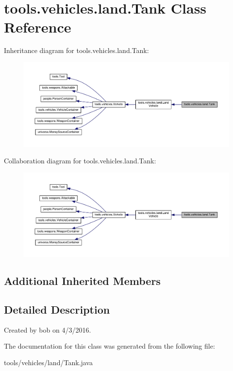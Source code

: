 \hypertarget{classtools_1_1vehicles_1_1land_1_1_tank}{}\section{tools.\+vehicles.\+land.\+Tank Class Reference}
\label{classtools_1_1vehicles_1_1land_1_1_tank}


Inheritance diagram for tools.\+vehicles.\+land.\+Tank\+:\nopagebreak
\begin{figure}[H]
\begin{center}
\leavevmode
\includegraphics[width=350pt]{classtools_1_1vehicles_1_1land_1_1_tank__inherit__graph}
\end{center}
\end{figure}


Collaboration diagram for tools.\+vehicles.\+land.\+Tank\+:\nopagebreak
\begin{figure}[H]
\begin{center}
\leavevmode
\includegraphics[width=350pt]{classtools_1_1vehicles_1_1land_1_1_tank__coll__graph}
\end{center}
\end{figure}
\subsection*{Additional Inherited Members}


\subsection{Detailed Description}
Created by bob on 4/3/2016. 

The documentation for this class was generated from the following file\+:\begin{DoxyCompactItemize}
\item 
tools/vehicles/land/Tank.\+java\end{DoxyCompactItemize}
